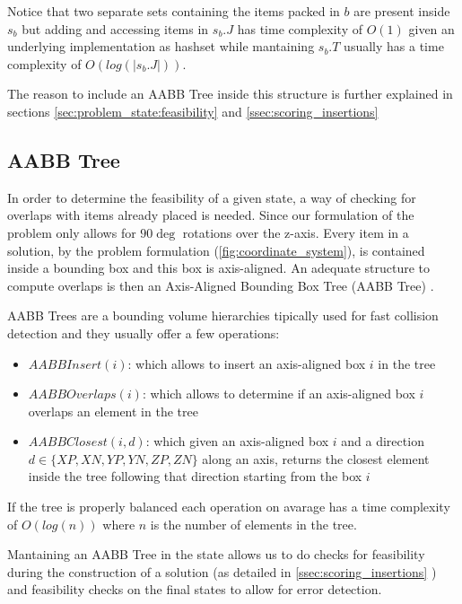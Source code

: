 Notice that two separate sets containing the items packed in $b$ are present inside $s_b$ but adding and accessing items in $s_b.J$ has time complexity of $O(1)$ given an underlying implementation as hashset while mantaining $s_b.T$ usually has a time complexity of $O(log(|s_b.J|))$.

The reason to include an AABB Tree inside this structure is further explained in sections \ref{sec:problem_state:feasibility} and \ref{ssec:scoring_insertions}

\subsection{AABB Tree}
\label{sec:problem_state:aabbtree}%

In order to determine the feasibility of a given state, a way of checking for overlaps with items already placed is needed.
Since our formulation of the problem only allows for $90\deg$ rotations over the z-axis. Every item in a solution, by the problem formulation (\ref{fig:coordinate_system}), is contained inside a bounding box and this box is axis-aligned.
An adequate structure to compute overlaps is then an Axis-Aligned Bounding Box Tree (AABB Tree) \cite{bergen1997efficient}.

AABB Trees are a bounding volume hierarchies tipically used for fast collision detection and they usually offer a few operations:
\begin{itemize}
    \item $AABBInsert(i)$: which allows to insert an axis-aligned box $i$ in the tree
    \item $AABBOverlaps(i)$: which allows to determine if an axis-aligned box $i$ overlaps an element in the tree
    \item $AABBClosest(i, d)$: which given an axis-aligned box $i$ and a direction $d \in \{ XP, XN, YP, YN, ZP, ZN \}$ along an axis, returns the closest element inside the tree following that direction starting from the box $i$
\end{itemize}

If the tree is properly balanced each operation on avarage has a time complexity of $O(log(n))$ where $n$ is the number of elements in the tree.

Mantaining an AABB Tree in the state allows us to do checks for feasibility during the construction of a solution (as detailed in \ref{ssec:scoring_insertions} ) and feasibility checks on the final states to allow for error detection.

